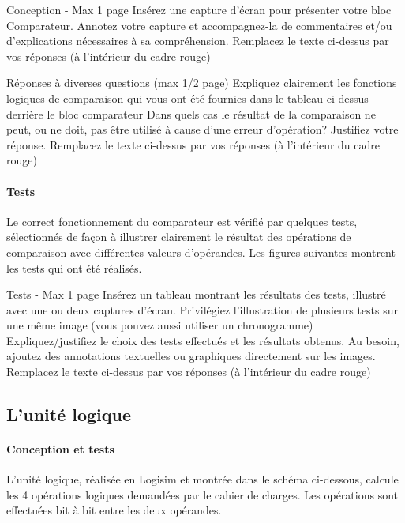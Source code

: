 \documentclass[a4paper]{article}
\begin{document}
\begin{tcolorbox}[colframe=Monokaimagenta,colback=white]
Conception - Max 1 page 
Insérez une capture d’écran pour présenter votre bloc Comparateur. 
Annotez votre capture et accompagnez-la de commentaires et/ou d’explications nécessaires à sa compréhension.
Remplacez le texte ci-dessus par vos réponses (à l’intérieur du cadre rouge)
\end{tcolorbox}

\begin{tcolorbox}[colframe=Monokaimagenta,colback=white]
Réponses à diverses questions (max 1/2 page)
Expliquez clairement les fonctions logiques de comparaison qui vous ont été fournies dans le tableau ci-dessus derrière le bloc comparateur 
Dans quels cas le résultat de la comparaison ne peut, ou ne doit, pas être utilisé à cause d’une erreur d’opération? Justifiez votre réponse.
Remplacez le texte ci-dessus par vos réponses (à l’intérieur du cadre rouge)
\end{tcolorbox}

\paragraph{Tests}
Le correct fonctionnement du comparateur est vérifié par quelques tests, sélectionnés de façon à illustrer clairement le résultat des opérations de comparaison avec différentes valeurs d’opérandes. Les figures suivantes montrent les tests qui ont été réalisés.

\begin{tcolorbox}[colframe=Monokaimagenta,colback=white]
Tests - Max 1 page 
Insérez  un tableau montrant les résultats des tests, illustré avec une ou deux captures d’écran. Privilégiez l’illustration de plusieurs tests sur une même image (vous pouvez aussi utiliser un chronogramme)
Expliquez/justifiez le choix des tests effectués et les résultats obtenus.
Au besoin, ajoutez des annotations textuelles ou graphiques directement sur les images.
Remplacez le texte ci-dessus par vos réponses (à l’intérieur du cadre rouge)
\end{tcolorbox}

\subsection{L'unité logique}
\label{logique}

\paragraph{Conception et tests}
L’unité logique, réalisée en Logisim et montrée dans le schéma ci-dessous, calcule les 4 opérations logiques demandées par le cahier de charges. Les opérations sont effectuées bit à bit entre les deux opérandes.
\end{document}
